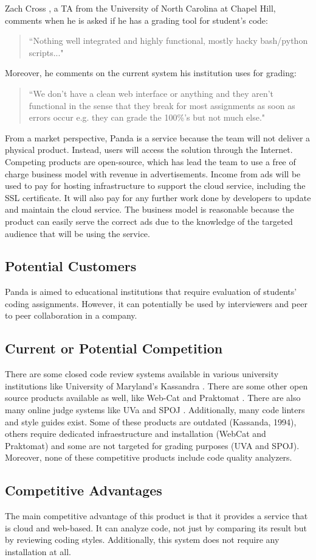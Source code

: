 
Zach Cross \cite{Zach}, a TA from the
University of North Carolina at Chapel Hill, comments when he is asked if he has
a grading tool for student's code: \begin{quote} ``Nothing well integrated and
highly functional, mostly hacky bash/python scripts..." \end{quote} Moreover, he
comments on the current system his institution uses for grading: \begin{quote}
``We don't have a clean web interface or anything and they aren't functional in
the sense that they break for most assignments as soon as errors occur e.g. they
can grade the 100\%'s but not much else." \end{quote}

From a market perspective, Panda is a service because the team
will not deliver a physical product. Instead, users will access the solution
through the Internet. Competing products are open-source, which has lead the
team to use a free of charge business model with revenue in advertisements.
Income from ads will be used to pay for hosting infrastructure to support the
cloud service, including the SSL certificate. It will also pay for any further
work done by developers to update and maintain the cloud service. The business
model is reasonable because the product can easily serve the correct ads due to
the knowledge of the targeted audience that will be using the service.

\subsection{Potential Customers}

Panda is aimed to educational institutions that
require evaluation of students' coding assignments. However, it can potentially
be used by interviewers and peer to peer collaboration in a company.

\subsection{Current or Potential Competition}

There are some closed code review systems available in various university
institutions like University of Maryland's Kassandra \cite{Matt1994}. There are
some other open source products available as well, like Web-Cat \cite{WebCat}
and Praktomat \cite{Praktomat}. There are also many online judge systems like
UVa \cite{UVA} and SPOJ \cite{SPOJ}. Additionally, many code linters and style
guides exist. Some of these products are outdated (Kassanda, 1994), others
require dedicated infraestructure and installation (WebCat and Praktomat) and
some are not targeted for grading purposes (UVA and SPOJ). Moreover,
none of these competitive products include code quality analyzers.

\subsection{Competitive Advantages}

The main competitive advantage of this product is that it provides a service
that is cloud and web-based. It can analyze code, not just by comparing its
result but by reviewing coding styles. Additionally, this system does not
require any installation at all.